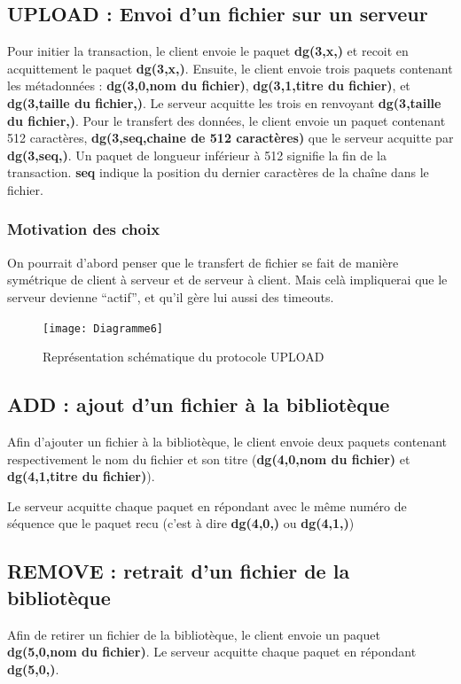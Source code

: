 \documentclass[10pt,a4paper]{article}
\begin{document}
\subsection{UPLOAD : Envoi d'un fichier sur un serveur}
Pour initier la transaction, le client envoie le paquet \textbf{dg(3,x,)} et recoit en acquittement le paquet \textbf{dg(3,x,)}.
Ensuite, le client envoie trois paquets contenant les métadonnées : \textbf{dg(3,0,nom du fichier)}, \textbf{dg(3,1,titre du fichier)}, et \textbf{dg(3,taille du fichier,)}. Le serveur acquitte les trois en renvoyant \textbf{dg(3,taille du fichier,)}.
Pour le transfert des données, le client envoie un paquet contenant 512 caractères, \textbf{dg(3,seq,chaine de 512 caractères)} que le serveur acquitte par \textbf{dg(3,seq,)}.
Un paquet de longueur inférieur à 512 signifie la fin de la transaction. \textbf{seq} indique la position du dernier caractères de la chaîne dans le fichier.

\subsubsection{Motivation des choix}
On pourrait d'abord penser que le transfert de fichier se fait de manière symétrique de client à serveur et de serveur à client. Mais celà impliquerai que le serveur devienne ``actif'', et qu'il gère lui aussi des timeouts.

\begin{figure}[H]
 \centering
 \texttt{[image: Diagramme6]}
 \caption{Représentation schématique du protocole UPLOAD}
\end{figure}

\subsection{ADD : ajout d'un fichier à la bibliotèque}
Afin d'ajouter un fichier à la bibliotèque, le client envoie deux paquets contenant respectivement le nom du fichier et son titre (\textbf{dg(4,0,nom du fichier)} et \textbf{dg(4,1,titre du fichier)}).

Le serveur acquitte chaque paquet en répondant avec le même numéro de séquence que le paquet recu (c'est à dire \textbf{dg(4,0,)} ou \textbf{dg(4,1,)})

\subsection{REMOVE : retrait d'un fichier de la bibliotèque}
Afin de retirer un fichier de la bibliotèque, le client envoie un paquet \textbf{dg(5,0,nom du fichier)}.
Le serveur acquitte chaque paquet en répondant \textbf{dg(5,0,)}.
\end{document}
